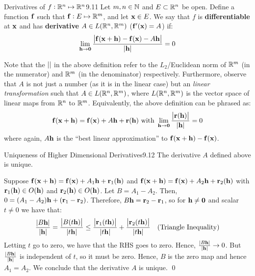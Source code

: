 \begin{definition}{Derivatives of $f: \mathbb{R}^n \mapsto \mathbb{R}^n$}{9.11}
    Let $m, n \in \mathbb{N}$ and $E \subset \mathbb{R}^n$ be open. Define a function $\mathbf{f}$ such that $\mathbf{f}: E \mapsto \mathbb{R}^m$, and let $\mathbf{x} \in E$. We say that $f$ is \textbf{differentiable} at $\mathbf{x}$ and has \textbf{derivative} $A \in L(\mathbb{R}^n, \mathbb{R}^m)$ ($\mathbf{f}'(\mathbf{x}) = A$) if:
    \begin{align*}
        \lim_{\mathbf{h} \rightarrow \mathbf{0}} \frac{\abs{\mathbf{f}(\mathbf{x} + \mathbf{h}) - \mathbf{f}(\mathbf{x}) - A\mathbf{h}}}{\abs{\mathbf{h}}} = 0
    \end{align*}
\end{definition}
\noindent Note that the $\abs{}$ in the above definition refer to the $L_2$/Euclidean norm of $\mathbb{R}^m$ (in the numerator) and $\mathbb{R}^m$ (in the denominator) respectively. Furthermore, observe that $A$ is not just a number (as it is in the linear case) but an \emph{linear transformation} such that $A \in L(\mathbb{R}^n, \mathbb{R}^m)$, where $L(\mathbb{R}^n, \mathbb{R}^m)$ is the vector space of linear maps from $\mathbb{R}^n$ to $\mathbb{R}^m$. Equivalently, the above definition can be phrased as:
\begin{align*}
    \mathbf{f}(\mathbf{x} + \mathbf{h}) = \mathbf{f}(\mathbf{x}) + A\mathbf{h} + \mathbf{r}(\mathbf{h}) \text{ with } \lim_{\mathbf{h} \rightarrow \mathbf{0}} \frac{\abs{\mathbf{r}(\mathbf{h})}}{\abs{\mathbf{h}}} = 0
\end{align*}
where again, $A\mathbf{h}$ is the ``best linear approximation'' to $\mathbf{f}(\mathbf{x} + \mathbf{h}) - \mathbf{f}(\mathbf{x})$. 

\begin{theorem}{Uniqueness of Higher Dimensional Derivatives}{9.12}
    The derivative $A$ defined above is unique.
\end{theorem}
\begin{nproof}
    Suppose $\mathbf{f}(\mathbf{x} + \mathbf{h}) = \mathbf{f}(\mathbf{x}) + A_1\mathbf{h} + \mathbf{r}_1(\mathbf{h})$ and $\mathbf{f}(\mathbf{x} + \mathbf{h}) = \mathbf{f}(\mathbf{x}) + A_2\mathbf{h} + \mathbf{r}_2(\mathbf{h})$ with $\mathbf{r}_1(\mathbf{h}) \in O(\mathbf{h})$ and $\mathbf{r}_2(\mathbf{h}) \in O(\mathbf{h})$. Let $B = A_1 - A_2$. Then, $0 = (A_1 - A_2)\mathbf{h} + (\mathbf{r}_1 - \mathbf{r}_2)$. Therefore, $B\mathbf{h} = \mathbf{r}_2 - \mathbf{r}_1$, so for $\mathbf{h} \neq \mathbf{0}$ and scalar $t \neq 0$ we have that:
    \begin{align*}
        \frac{\abs{B\mathbf{h}}}{\abs{\mathbf{h}}} = \frac{\abs{B(t\mathbf{h})}}{\abs{t\mathbf{h}}} \leq \frac{\abs{\mathbf{r}_1(t\mathbf{h})}}{\abs{t\mathbf{h}}} + \frac{\abs{\mathbf{r}_2(t\mathbf{h})}}{\abs{t\mathbf{h}}} \quad \text{(Triangle Inequality)}
    \end{align*} 
    Letting $t$ go to zero, we have that the RHS goes to zero. Hence, $\frac{\abs{B\mathbf{h}}}{\abs{\mathbf{h}}} \rightarrow 0$. But $\frac{\abs{B\mathbf{h}}}{\abs{\mathbf{h}}}$ is independent of $t$, so it must be zero. Hence, $B$ is the zero map and hence $A_1 = A_2$. We conclude that the derivative $A$ is unique. \qed
\end{nproof}

